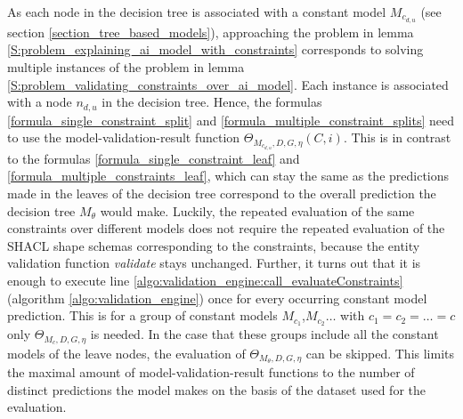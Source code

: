 As each node in the decision tree is associated with a constant model $M_{c_{d,u}}$ (see section \ref{section_tree_based_models}), approaching the problem in lemma \ref{S:problem_explaining_ai_model_with_constraints} corresponds to solving multiple instances of the problem in lemma \ref{S:problem_validating_constraints_over_ai_model}. Each instance is associated with a node $n_{d,u}$ in the decision tree. Hence, the formulas \ref{formula_single_constraint_split} and \ref{formula_multiple_constraint_splits} need to use the model-validation-result function $\Theta_{M_{c_{d,u}},D,G,\eta}(C,i)$. This is in contrast to the formulas \ref{formula_single_constraint_leaf} and \ref{formula_multiple_constraints_leaf}, which can stay the same as the predictions made in the leaves of the decision tree correspond to the overall prediction the decision tree $M_\theta$ would make.
Luckily, the repeated evaluation of the same constraints over different models does not require the repeated evaluation of the SHACL shape schemas corresponding to the constraints, because the entity validation function \emph{validate} stays unchanged. Further, it turns out that it is enough to execute line \ref{algo:validation_engine:call_evaluateConstraints} (algorithm \ref{algo:validation_engine}) once for every occurring constant model prediction. This is for a group of constant models $M_{c_1}$,$M_{c_2}\hdots$ with $c_1 = c_2 = \hdots = c$ only $\Theta_{M_{c},D,G,\eta}$ is needed. In the case that these groups include all the constant models of the leave nodes, the evaluation of $\Theta_{M_{\theta},D,G,\eta}$ can be skipped. This limits the maximal amount of model-validation-result functions to the number of distinct predictions the model makes on the basis of the dataset used for the evaluation.


